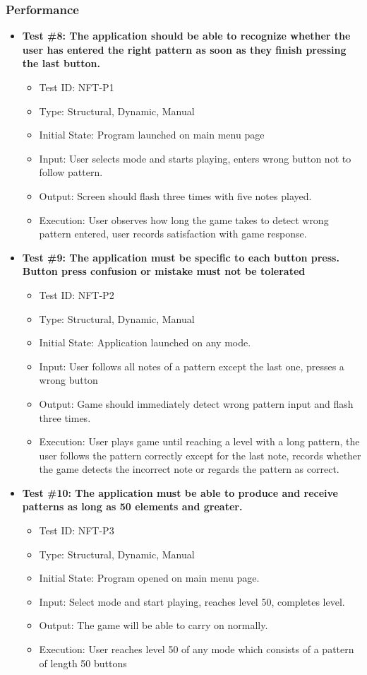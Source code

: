 \documentclass[12pt, titlepage]{article}
\begin{document}
\subsubsection{Performance}
\begin{itemize}
\item \textbf{Test \#8: The application should be able to recognize whether the user has entered the right pattern as soon as they finish pressing the last button.}
\begin{itemize}
\item Test ID: NFT-P1
\item Type: Structural, Dynamic, Manual				
\item Initial State: Program launched on main menu page		
\item Input: User selects mode and starts playing, enters wrong button not to follow pattern.
\item Output: Screen should flash three times with five notes played.		
\item Execution: User observes how long the game takes to detect wrong pattern entered, user records satisfaction with game response.
\end{itemize}

\item \textbf{Test \#9: The application must be specific to each button press. Button press confusion or mistake must not be tolerated}
\begin{itemize}
\item Test ID: NFT-P2
\item Type: Structural, Dynamic, Manual			
\item Initial State: Application launched on any mode.			
\item Input: User follows all notes of a pattern except the last one, presses a wrong button			
\item Output: Game should immediately detect wrong pattern input and flash three times.				
\item Execution: User plays game until reaching a level with a long pattern, the user follows the pattern correctly except for the last note, records whether the game detects the incorrect note or regards the pattern as correct.
\end{itemize}

\item \textbf{Test \#10: The application must be able to produce and receive patterns as long as 50 elements and greater.}
\begin{itemize}
\item Test ID: NFT-P3
\item Type: Structural, Dynamic, Manual				
\item Initial State: Program opened on main menu page.		
\item Input: Select mode and start playing, reaches level 50, completes level.
\item Output: The game will be able to carry on normally.
\item Execution: User reaches level 50 of any mode which consists of a pattern of length 50 buttons
\end{itemize}
\end{itemize}
\end{document}

